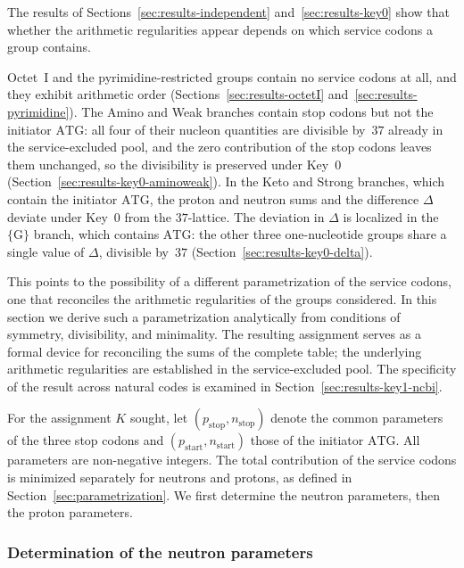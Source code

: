\documentclass[11pt,a4paper]{article}
\renewcommand{\_}{\origunderscore\allowbreak}
\begin{document}
The results of Sections~\ref{sec:results-independent}
and~\ref{sec:results-key0} show that whether the arithmetic
regularities appear depends on which service codons a group
contains.

Octet~I and the pyrimidine-restricted groups contain no
service codons at all, and they exhibit arithmetic order
(Sections~\ref{sec:results-octetI}
and~\ref{sec:results-pyrimidine}). The Amino and Weak
branches contain stop codons but not the initiator
$\mathrm{ATG}$: all four of their nucleon quantities are
divisible by~$37$ already in the service-excluded pool, and
the zero contribution of the stop codons leaves them
unchanged, so the divisibility is preserved under Key~0
(Section~\ref{sec:results-key0-aminoweak}). In the Keto and
Strong branches, which contain the initiator $\mathrm{ATG}$,
the proton and neutron sums and the difference $\Delta$
deviate under Key~0 from the $37$-lattice. The deviation in
$\Delta$ is localized in the $\{\mathrm{G}\}$ branch, which
contains $\mathrm{ATG}$: the other three one-nucleotide
groups share a single value of $\Delta$, divisible by~$37$
(Section~\ref{sec:results-key0-delta}).

This points to the possibility of a different
parametrization of the service codons, one that reconciles
the arithmetic regularities of the groups considered. In this
section we derive such a parametrization analytically from
conditions of symmetry, divisibility, and minimality. The
resulting assignment serves as a formal device for
reconciling the sums of the complete table; the underlying
arithmetic regularities are established in the
service-excluded pool. The specificity of the result across
natural codes is examined in
Section~\ref{sec:results-key1-ncbi}.

For the assignment $K$ sought, let
$(p_{\text{stop}}, n_{\text{stop}})$ denote the common
parameters of the three stop codons and
$(p_{\text{start}}, n_{\text{start}})$ those of the
initiator $\mathrm{ATG}$.
All parameters are non-negative integers.
The total contribution of the service codons is minimized
separately for neutrons and protons, as defined in
Section~\ref{sec:parametrization}.
We first determine the neutron parameters, then the proton
parameters.

\subsubsection{Determination of the neutron parameters}
\label{sec:results-key1-neutrons}
\end{document}
